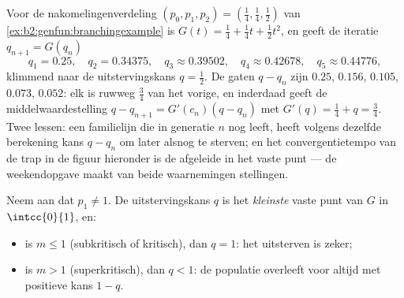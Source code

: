 \begin{example}
\label{ex:b2:genfun:cobwebnumerics}
Voor de nakomelingenverdeling $(p_0, p_1, p_2) = (\tfrac14,
\tfrac14, \tfrac12)$ van \cref{ex:b2:genfun:branchingexample} is
$G(t) = \tfrac14 + \tfrac14t + \tfrac12t^2$, en geeft de iteratie
$q_{n+1} = G(q_n)$
\[
q_1 = 0.25, \quad q_2 = 0.34375, \quad q_3 \approx 0.39502,
\quad q_4 \approx 0.42678, \quad q_5 \approx 0.44776,
\]
klimmend naar de uitstervingskans $q = \tfrac12$. De gaten $q -
q_n$ zijn $0.25$, $0.156$, $0.105$, $0.073$, $0.052$: elk is
ruwweg $\tfrac34$ van het vorige, en inderdaad geeft de
middelwaardestelling $q - q_{n+1} = G'(c_n)(q - q_n)$ met $G'(q) =
\tfrac14 + q = \tfrac34$. Twee lessen: een familielijn die in
generatie $n$ nog leeft, heeft volgens dezelfde berekening kans $q
- q_n$ om later alsnog te sterven; en het convergentietempo van de
trap in de figuur hieronder is de afgeleide in het vaste punt ---
de weekendopgave maakt van beide waarnemingen stellingen.
\end{example}

\begin{theorem}[Uitstervingscriterium]\label{thm:b2:genfun:extinction}
Neem aan dat $p_1 \neq 1$. De uitstervingskans $q$ is het
\emph{kleinste} vaste punt van $G$ in $\intcc{0}{1}$, en:
\begin{itemize}
\item is $m \leq 1$ (subkritisch of kritisch), dan $q = 1$: het
uitsterven is zeker;
\item is $m > 1$ (superkritisch), dan $q < 1$: de populatie
overleeft voor altijd met positieve kans $1 - q$.
\end{itemize}
\end{theorem}

